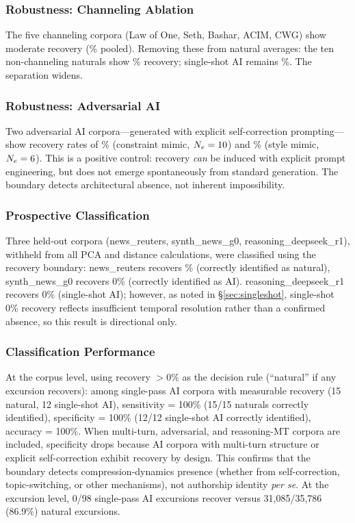 \documentclass[final]{clv2025}
\begin{document}
\subsubsection{Robustness: Channeling Ablation}

The five channeling corpora (Law of One, Seth, Bashar, ACIM, CWG) show moderate recovery (\recChannelingMean\% pooled). Removing these from natural averages: the ten non-channeling naturals show \recNaturalNonChanneling\% recovery; single-shot AI remains \recAISingleShot\%. The separation widens.

\subsubsection{Robustness: Adversarial AI}

Two adversarial AI corpora---generated with explicit self-correction prompting---show recovery rates of \recAdvConstraint\% (constraint mimic, $N_e = 10$) and \recAdvStyle\% (style mimic, $N_e = 6$). This is a positive control: recovery \textit{can} be induced with explicit prompt engineering, but does not emerge spontaneously from standard generation. The boundary detects architectural absence, not inherent impossibility.

\subsubsection{Prospective Classification}

Three held-out corpora (news\_reuters, synth\_news\_g0, reasoning\_deepseek\_r1), withheld from all PCA and distance calculations, were classified using the recovery boundary: news\_reuters recovers \recNewsReuters\% (correctly identified as natural), synth\_news\_g0 recovers 0\% (correctly identified as AI). reasoning\_deepseek\_r1 recovers 0\% (single-shot AI); however, as noted in \S\ref{sec:singleshot}, single-shot 0\% recovery reflects insufficient temporal resolution rather than a confirmed absence, so this result is directional only.

\subsubsection{Classification Performance}

At the corpus level, using recovery $> 0\%$ as the decision rule (``natural'' if any excursion recovers): among single-pass AI corpora with measurable recovery (15 natural, 12 single-shot AI), sensitivity = 100\% (15/15 naturals correctly identified), specificity = 100\% (12/12 single-shot AI correctly identified), accuracy = 100\%. When multi-turn, adversarial, and reasoning-MT corpora are included, specificity drops because AI corpora with multi-turn structure or explicit self-correction exhibit recovery by design. This confirms that the boundary detects compression-dynamics presence (whether from self-correction, topic-switching, or other mechanisms), not authorship identity \textit{per se}. At the excursion level, 0/98 single-pass AI excursions recover versus 31,085/35,786 (86.9\%) natural excursions.
\end{document}
